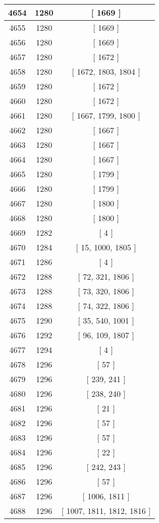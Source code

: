 \begin{center}
\begin{longtable}[H]{|| c c c ||}
\hline
4654 & 1280 & [ 1669 ] \\ 
\hline
4655 & 1280 & [ 1669 ] \\ 
\hline
4656 & 1280 & [ 1669 ] \\ 
\hline
4657 & 1280 & [ 1672 ] \\ 
\hline
4658 & 1280 & [ 1672, 1803, 1804 ] \\ 
\hline
4659 & 1280 & [ 1672 ] \\ 
\hline
4660 & 1280 & [ 1672 ] \\ 
\hline
4661 & 1280 & [ 1667, 1799, 1800 ] \\ 
\hline
4662 & 1280 & [ 1667 ] \\ 
\hline
4663 & 1280 & [ 1667 ] \\ 
\hline
4664 & 1280 & [ 1667 ] \\ 
\hline
4665 & 1280 & [ 1799 ] \\ 
\hline
4666 & 1280 & [ 1799 ] \\ 
\hline
4667 & 1280 & [ 1800 ] \\ 
\hline
4668 & 1280 & [ 1800 ] \\ 
\hline
4669 & 1282 & [ 4 ] \\ 
\hline
4670 & 1284 & [ 15, 1000, 1805 ] \\ 
\hline
4671 & 1286 & [ 4 ] \\ 
\hline
4672 & 1288 & [ 72, 321, 1806 ] \\ 
\hline
4673 & 1288 & [ 73, 320, 1806 ] \\ 
\hline
4674 & 1288 & [ 74, 322, 1806 ] \\ 
\hline
4675 & 1290 & [ 35, 540, 1001 ] \\ 
\hline
4676 & 1292 & [ 96, 109, 1807 ] \\ 
\hline
4677 & 1294 & [ 4 ] \\ 
\hline
4678 & 1296 & [ 57 ] \\ 
\hline
4679 & 1296 & [ 239, 241 ] \\ 
\hline
4680 & 1296 & [ 238, 240 ] \\ 
\hline
4681 & 1296 & [ 21 ] \\ 
\hline
4682 & 1296 & [ 57 ] \\ 
\hline
4683 & 1296 & [ 57 ] \\ 
\hline
4684 & 1296 & [ 22 ] \\ 
\hline
4685 & 1296 & [ 242, 243 ] \\ 
\hline
4686 & 1296 & [ 57 ] \\ 
\hline
4687 & 1296 & [ 1006, 1811 ] \\ 
\hline
4688 & 1296 & [ 1007, 1811, 1812, 1816 ] \\ 

\end{longtable}
\end{center}
